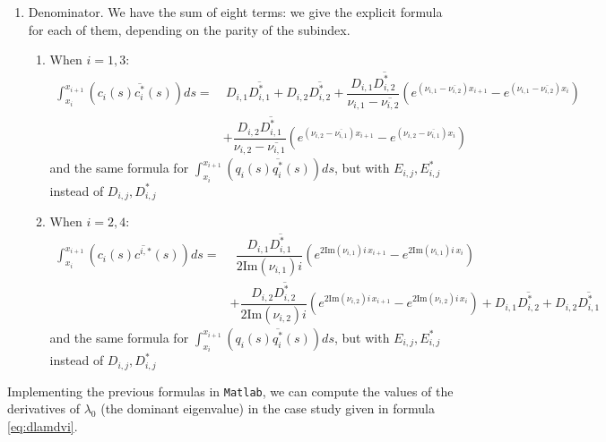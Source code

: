 \documentclass[a4paper]{article}
\def\Im{{\textrm{Im}}}
\newcommand{\X}[3]{#1_{#3,#2}}
\newcommand{\Xe}[3]{#1^*_{#3,#2}}
\numberwithin{equation}{section}
\begin{document}
\begin{enumerate}
\begin{enumerate}
\begin{align*}
        -\X{D}{1}{k} \overline{\Xe{D}{2}{k}}\X{\nu}{1}{k}  -\X{D}{2}{k} \overline{\Xe{D}{1}{k}}\X{\nu}{2}{k}
    \end{align*}
   \end{enumerate}
\item Denominator. We have the sum of eight terms: we give the explicit formula for each of them, depending on the parity of the subindex.
   \begin{enumerate}
   \item When $i=1,3$:
    \begin{align*}
     \int_{x_i}^{x_{i+1}} (c_i(s) \overline{c_i^{*}}(s)) ds =
     &\  \X{D}{1}{i} \overline{\Xe{D}{1}{i}} + \X{D}{2}{i} \overline{\Xe{D}{2}{i}} +
     \dfrac{\X{D}{1}{i} \overline{\Xe{D}{2}{i}}}{\X{\nu}{1}{i}-\overline{\X{\nu}{2}{i}}}\left( e^{\left( \X{\nu}{1}{i}-\overline{\X{\nu}{2}{i}}\right) x_{i+1}}  -e^{\left( \X{\nu}{1}{i}-\overline{\X{\nu}{2}{i}}\right) x_{i}}  \right) \\
     &+    \dfrac{\X{D}{2}{i} \overline{\Xe{D}{1}{i}}}{\X{\nu}{2}{i}-\overline{\X{\nu}{1}{i}}}\left( e^{\left( \X{\nu}{2}{i}-\overline{\X{\nu}{1}{i}}\right) x_{i+1}}  -e^{\left( \X{\nu}{2}{i}-\overline{\X{\nu}{1}{i}}\right) x_{i}}  \right)
    \end{align*}
    and the same formula for $\int_{x_i}^{x_{i+1}} (q_i(s) \overline{q_i^{*}}(s)) ds$, but with $\X{E}{j}{i}, \Xe{E}{j}{i}$ instead of $\X{D}{j}{i}, \Xe{D}{j}{i}$
   \item When $i=2,4$:
   \begin{align*}
     \int_{x_i}^{x_{i+1}} (c_i(s) \overline{c^{i,*}}(s)) ds =
    &\ \ \dfrac{\X{D}{1}{i} \overline{\Xe{D}{1}{i}}}{2\Im(\X{\nu}{1}{i})i} \left( e^{ 2\Im(\X{\nu}{1}{i})i\, x_{i+1}}  -e^{2\Im(\X{\nu}{1}{i})i\, x_{i}}\right) \\
    &+\dfrac{\X{D}{2}{i} \overline{\Xe{D}{2}{i}}}{2\Im(\X{\nu}{2}{i})i} \left( e^{ 2\Im(\X{\nu}{2}{i})i\, x_{i+1}}  -e^{2\Im(\X{\nu}{2}{i})i\, x_{i}}\right)
    + \X{D}{1}{i} \overline{\Xe{D}{2}{i}} +\X{D}{2}{i} \overline{\Xe{D}{1}{i}}
   \end{align*}
     and the same formula for $\int_{x_i}^{x_{i+1}} (q_i(s) \overline{q_i^{*}}(s)) ds$, but with $\X{E}{j}{i}, \Xe{E}{j}{i}$ instead of $\X{D}{j}{i}, \Xe{D}{j}{i}$
  \end{enumerate}
  \end{enumerate}
Implementing the previous formulas in \verb"Matlab", we can compute the values of the derivatives of $\lambda_0$ (the dominant eigenvalue) in the case study given in formula \eqref{eq:dlamdvi}.
\end{document}

